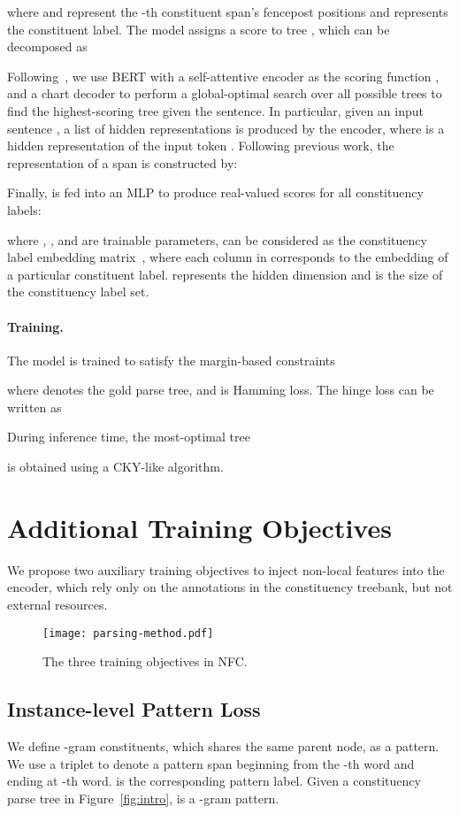 \documentclass[11pt]{article}
\begin{document}
where  and  represent the -{th} constituent span's fencepost positions and  represents the constituent label. 
The model assigns a score  to tree , which can be decomposed as


Following~\citet{kitaev-etal-2019-multi-lingual}, we use BERT with a self-attentive encoder as the scoring function , and a chart decoder to perform a global-optimal search over all possible trees to find the highest-scoring tree given the sentence.
In particular, given an input sentence , a list of hidden representations  is produced by the encoder, where  is a hidden representation of the input token . 
Following previous work, the representation of a span  is constructed by:


Finally,  is fed into an MLP to produce real-valued scores  for all constituency labels: 

where 
, ,  and  are trainable parameters, 
 can be considered as the constituency label embedding matrix~\cite{lan}, where each column in  corresponds to the embedding of a particular constituent label.  represents the hidden dimension and  is the size of the constituency label set. 


\paragraph{Training.}
The model is trained to satisfy the margin-based constraints 

where  denotes the gold parse tree, and  is Hamming loss. 
The hinge loss can be written as


During inference time, the most-optimal tree

is obtained using a CKY-like algorithm. 

\section{Additional Training Objectives}
We propose two auxiliary training objectives to inject non-local features into the encoder, which rely only on the annotations in the constituency treebank, but not external resources. 

\begin{figure}
    \centering
    \texttt{[image: parsing-method.pdf]}
    \caption{The three training objectives in NFC.}
    \label{fig:method}
\end{figure}

\subsection{Instance-level Pattern Loss}
\label{sec:pattern_loss}
We define -gram constituents, which shares the same parent node, as a pattern. 
We use a triplet  to denote a pattern span beginning from the -th word and ending at -th word. 
 is the corresponding pattern label. 
Given a constituency parse tree in Figure~\ref{fig:intro},  is a -gram pattern.
\end{document}
